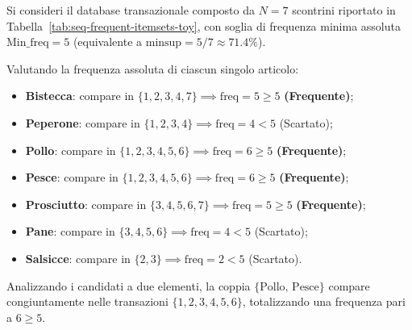 \begin{example}
Si consideri il database transazionale composto da $N = 7$ scontrini riportato in Tabella~\ref{tab:seq-frequent-itemsets-toy}, con soglia di frequenza minima assoluta $\text{Min\_freq} = 5$ (equivalente a $\text{minsup} = 5/7 \approx 71.4\%$).

\begin{table}[H]
\centering
\small
\renewcommand{\arraystretch}{1.2}
\caption{Database transazionale binario giocattolo ($N = 7$ transazioni).}
\label{tab:seq-frequent-itemsets-toy}
\end{table}

Valutando la frequenza assoluta di ciascun singolo articolo:
\begin{itemize}[noitemsep]
    \item \textbf{Bistecca}: compare in $\{1, 2, 3, 4, 7\} \implies \text{freq} = 5 \ge 5$ \textbf{(Frequente)};
    \item \textbf{Peperone}: compare in $\{1, 2, 3, 4\} \implies \text{freq} = 4 < 5$ (Scartato);
    \item \textbf{Pollo}: compare in $\{1, 2, 3, 4, 5, 6\} \implies \text{freq} = 6 \ge 5$ \textbf{(Frequente)};
    \item \textbf{Pesce}: compare in $\{1, 2, 3, 4, 5, 6\} \implies \text{freq} = 6 \ge 5$ \textbf{(Frequente)};
    \item \textbf{Prosciutto}: compare in $\{3, 4, 5, 6, 7\} \implies \text{freq} = 5 \ge 5$ \textbf{(Frequente)};
    \item \textbf{Pane}: compare in $\{3, 4, 5, 6\} \implies \text{freq} = 4 < 5$ (Scartato);
    \item \textbf{Salsicce}: compare in $\{2, 3\} \implies \text{freq} = 2 < 5$ (Scartato).
\end{itemize}
Analizzando i candidati a due elementi, la coppia $\{\text{Pollo, Pesce}\}$ compare congiuntamente nelle transazioni $\{1, 2, 3, 4, 5, 6\}$, totalizzando una frequenza pari a $6 \ge 5$.


\end{example}
